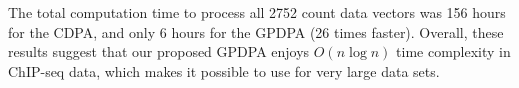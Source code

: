 \documentclass[aoas]{imsart}
\begin{document}
The total computation time to process all 2752 count data vectors was
156 hours for the CDPA, and only 6 hours for the GPDPA (26 times
faster). Overall, these results suggest that our proposed GPDPA enjoys
$O(n\log n)$ time complexity in ChIP-seq data, which makes it possible
to use for very large data sets.






\end{document}
